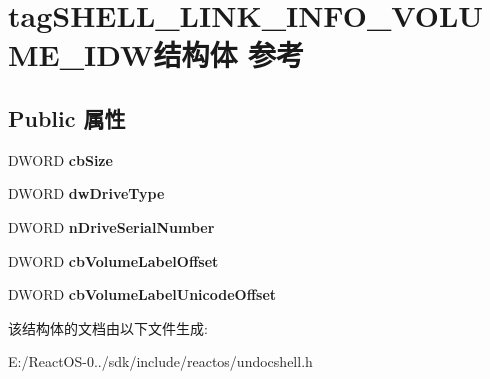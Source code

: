 \hypertarget{structtag_s_h_e_l_l___l_i_n_k___i_n_f_o___v_o_l_u_m_e___i_d_w}{}\section{tag\+S\+H\+E\+L\+L\+\_\+\+L\+I\+N\+K\+\_\+\+I\+N\+F\+O\+\_\+\+V\+O\+L\+U\+M\+E\+\_\+\+I\+D\+W结构体 参考}
\label{structtag_s_h_e_l_l___l_i_n_k___i_n_f_o___v_o_l_u_m_e___i_d_w}
\subsection*{Public 属性}
\begin{DoxyCompactItemize}
\item 
\mbox{\label{structtag_s_h_e_l_l___l_i_n_k___i_n_f_o___v_o_l_u_m_e___i_d_w_ac7b6530e5e3ef41eed6e9b9aab3f41a1}} 
D\+W\+O\+RD {\bfseries cb\+Size}
\item 
\mbox{\label{structtag_s_h_e_l_l___l_i_n_k___i_n_f_o___v_o_l_u_m_e___i_d_w_a2753152deade5b87611167fae6f5ae28}} 
D\+W\+O\+RD {\bfseries dw\+Drive\+Type}
\item 
\mbox{\label{structtag_s_h_e_l_l___l_i_n_k___i_n_f_o___v_o_l_u_m_e___i_d_w_a80e2b2441f2338473a92991de57ef181}} 
D\+W\+O\+RD {\bfseries n\+Drive\+Serial\+Number}
\item 
\mbox{\label{structtag_s_h_e_l_l___l_i_n_k___i_n_f_o___v_o_l_u_m_e___i_d_w_a8a750f488ac7a7c1c2ea8750a17a0c10}} 
D\+W\+O\+RD {\bfseries cb\+Volume\+Label\+Offset}
\item 
\mbox{\label{structtag_s_h_e_l_l___l_i_n_k___i_n_f_o___v_o_l_u_m_e___i_d_w_a3166575e5a34faee2f8f32a15e395d73}} 
D\+W\+O\+RD {\bfseries cb\+Volume\+Label\+Unicode\+Offset}
\end{DoxyCompactItemize}


该结构体的文档由以下文件生成\+:\begin{DoxyCompactItemize}
\item 
E\+:/\+React\+O\+S-\/0../sdk/include/reactos/undocshell.\+h\end{DoxyCompactItemize}

